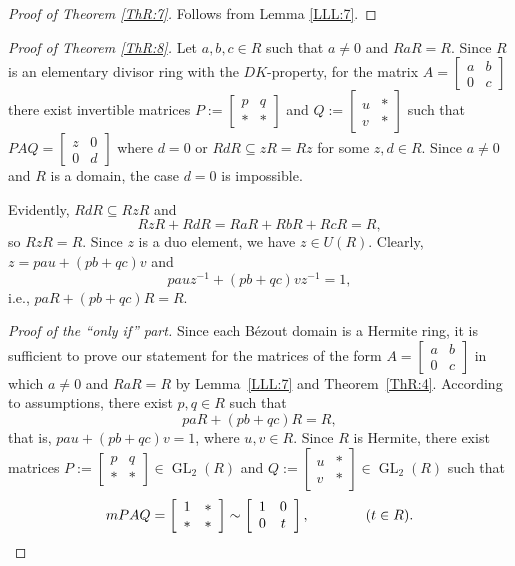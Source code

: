\documentclass{cimart}
\DeclareMathOperator\GL{GL}
\begin{document}
\begin{proof}[Proof of Theorem \ref{ThR:7}]
Follows from  Lemma \ref{LLL:7}.
\end{proof}


\begin{proof}[Proof of Theorem \ref{ThR:8}]
Let $a,b,c\in R$ such that $a\ne 0$ and  $RaR=R$. Since $R$ is an elementary divisor ring with the $DK$-property, for the matrix $A=\left[\begin{array}{cc}
                         a& b \\
                         0 & c
\end{array}\right]$ there exist invertible matrices
$P:=\left[\begin{array}{cc}p&q\\ *&*\end{array}\right]$ and $Q:=\left[\begin{array}{cc}  u& * \\ v & * \end{array}\right]$
such that $PAQ=\left[\begin{array}{cc}z&0\\ 0&d\end{array}\right]$     where $d=0$ or $RdR\subseteq zR=Rz$ for some  $z,d\in R$. Since $a\ne 0$ and $R$ is a domain, the case  $d= 0$ is impossible.

Evidently,  $RdR\subseteq RzR$ and
\[
RzR+RdR=RaR+RbR+RcR=R,
\]
so $RzR=R$. Since $z$ is a duo element, we have    $z\in U(R)$.  Clearly,  $z=pau+(pb+qc)v$  and
\[
pauz^{-1}+(pb+qc)vz^{-1}=1,
\]
 i.e., $paR+(pb+qc)R=R$.


{\it Proof of the ``only if'' part.}   Since each B\'ezout domain is a Hermite ring,   it is sufficient to prove our statement for the matrices of the form   $A=\left[\begin{array}{cc}
                         a& b \\
                         0 & c
\end{array}\right]$
in which $a\ne 0$ and $RaR=R$ by Lemma~\ref{LLL:7} and Theorem~\ref{ThR:4}. According to assumptions, there exist $p,q\in R$ such that
\[
paR+(pb+qc)R=R,
\]
that is, $pau+(pb+qc)v=1$, where  $u,v\in R$. Since $R$ is Hermite,  there exist matrices   $P:=\left[\begin{array}{cc}p&q\\ *&*\end{array}\right]\in \GL_2(R)$ and  $Q:=\left[\begin{array}{cc}  u& * \\ v & * \end{array}\right]\in \GL_2(R)$ such that
\[
m    PAQ=\left[\begin{array}{cc}1&*\\ *&*\end{array}\right]\sim \left[\begin{array}{cc}
      1& 0 \\
      0 & t
\end{array}\right],
\qquad \qquad (t\in R).
\qedhere
\]
\end{proof}
\end{document}
